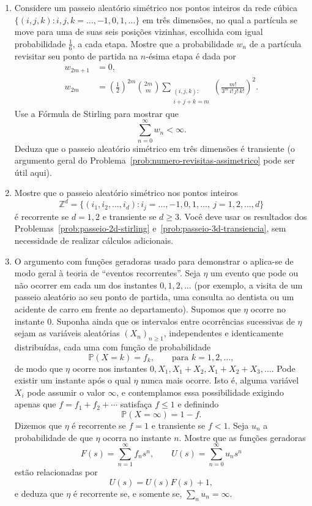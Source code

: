 \documentclass[12pt,portuguese]{article}
\theoremstyle{definition}
\theoremstyle{plainexercise}
\theoremstyle{starredexercise}
\theoremstyle{definition}
\begin{document}
\begin{enumerate}[label={\arabic*.}]
\smallskip
\noindent\emph{(Oxford, 1979)}

\item\label{prob:passeio-3d-transiencia}
Considere um passeio aleatório simétrico nos pontos inteiros da rede cúbica
$\{(i,j,k):i,j,k=\ldots,-1,0,1,\ldots\}$ em três dimensões, no qual a
partícula se move para uma de suas seis posições vizinhas, escolhida com igual
probabilidade $\tfrac{1}{6}$, a cada etapa. Mostre que a probabilidade $w_n$ de
a partícula revisitar seu ponto de partida na $n$-ésima etapa é dada por
\[
\begin{aligned}
w_{2m+1} &= 0, \\[0.2cm]
w_{2m} &= \left(\frac{1}{2}\right)^{2m}\binom{2m}{m}
\sum_{\substack{(i,j,k): \\ i+j+k=m}}
\left(\frac{m!}{3^m\,i!\,j!\,k!}\right)^2.
\end{aligned}
\]
Use a Fórmula de Stirling para mostrar que
\[
\sum_{n=0}^{\infty}w_n<\infty.
\]
Deduza que o passeio aleatório simétrico em três dimensões é transiente (o
argumento geral do Problema~\ref{prob:numero-revisitas-assimetrico} pode ser
útil aqui).

\item\label{prob:passeio-zd-recorrencia}
Mostre que o passeio aleatório simétrico nos pontos inteiros
\[
\mathbb{Z}^d=\{(i_1,i_2,\ldots,i_d):i_j=\ldots,-1,0,1,\ldots,\ j=1,2,\ldots,d\}
\]
é recorrente se $d=1,2$ e transiente se $d\geqslant 3$. Você deve usar os
resultados dos Problemas~\ref{prob:passeio-2d-stirling}
e~\ref{prob:passeio-3d-transiencia}, sem necessidade de realizar cálculos
adicionais.

\item\label{prob:eventos-recorrentes}
O argumento com funções geradoras usado para demonstrar o
 aplica-se de modo geral à teoria de
``eventos recorrentes''. Seja $\eta$ um evento que pode ou não ocorrer em cada
um dos instantes $0,1,2,\ldots$ (por exemplo, a visita de um passeio aleatório
ao seu ponto de partida, uma consulta ao dentista ou um acidente de carro em
frente ao departamento). Supomos que $\eta$ ocorre no instante $0$. Suponha
ainda que os intervalos entre ocorrências sucessivas de $\eta$ sejam as
variáveis aleatórias $(X_n)_{n \geqslant 1}$, independentes e identicamente
distribuídas, cada uma com função de probabilidade
\[
\mathbb{P}(X=k)=f_k, \qquad\text{para } k=1,2,\ldots,
\]
de modo que $\eta$ ocorre nos instantes
$0,X_1,X_1+X_2,X_1+X_2+X_3,\ldots$. Pode existir um instante após o qual $\eta$
nunca mais ocorre. Isto é, alguma variável $X_i$ pode assumir o valor $\infty$,
e contemplamos essa possibilidade exigindo apenas que $f=f_1+f_2+\cdots$
satisfaça $f\leqslant 1$ e definindo
\[
\mathbb{P}(X=\infty)=1-f.
\]
Dizemos que $\eta$ é recorrente se $f=1$ e transiente se $f<1$. Seja $u_n$ a
probabilidade de que $\eta$ ocorra no instante $n$. Mostre que as funções
geradoras
\[
F(s)=\sum_{n=1}^{\infty}f_ns^n,
\qquad
U(s)=\sum_{n=0}^{\infty}u_ns^n
\]
estão relacionadas por
\[
U(s)=U(s)F(s)+1,
\]
e deduza que $\eta$ é recorrente se, e somente se, $\sum_n u_n=\infty$.


\end{enumerate}
\end{document}
